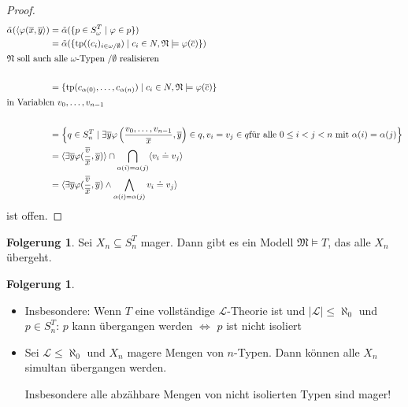 \documentclass[12pt,parskip=full]{scrartcl}
\newcommand{\abs}[1]{{\left| #1 \right|}}
\theoremstyle{definition}
\newtheorem{corollary}[theorem]{Folgerung}
\begin{document}
\begin{proof}
		\begin{align*}
			\tilde{\alpha}(\langle \varphi(\overline{x}, \overline{y} \rangle ) &= \tilde{\alpha}(\{ p \in S_\omega^T \mid \varphi \in p \}) \\
			&= \tilde{\alpha}(\{ \operatorname{tp}((c_i)_{i \in \omega / \emptyset}) \mid c_i \in N, \mathfrak{N} \models \varphi(\overline{c}) \}) \\
			\intertext{$\mathfrak{N}$ soll auch alle $\omega$-Typen $/\emptyset$ realisieren} \\
			&= \{ \operatorname{tp}(c_{\alpha(0)}, \dots, c_{\alpha(n)}) \mid c_i \in N, \mathfrak{N} \models \varphi(\overline{c}) \} \\
			\intertext{in Variablen $v_0, \dots, v_{n-1}$} \\
			&= \left\{ q \in S_n^T \mid \exists \overline{y} \varphi\left( \frac{v_0, \dots, v_{n-1}}{\overline{x}} , \overline{y} \right) \in q, v_i = v_j \in q \text{für alle $0 \leq i < j < n$ mit $\alpha(i) = \alpha(j)$} \right\} \\
			&= \langle \exists \overline{y} \varphi(\frac{\overline{v}}{\overline{x}}, \overline{y}) \rangle \cap \bigcap_{\alpha(i) = \alpha(j)} \langle v_i \doteq v_j \rangle \\
			&= \langle \exists \overline{y} \varphi(\frac{\overline{v}}{\overline{x}}, \overline{y}) \land \bigwedge_{\alpha(i) = \alpha(j)} v_i \doteq v_j \rangle
		\end{align*}
		ist offen.
	
	\end{proof}

	\begin{corollary}
		Sei $X_n \subseteq S_n^T$ mager. Dann gibt es ein Modell $\mathfrak{M} \models T$, das alle $X_n$ übergeht.
	\end{corollary}

	\begin{corollary}
		\begin{itemize}
			\item Insbesondere: Wenn $T$ eine vollständige $\mathcal{L}$-Theorie ist und $\abs{\mathcal{L}} \leq \aleph_0$ und $p \in S_n^T$: $p$ kann übergangen werden $\Leftrightarrow$ $p$ ist nicht isoliert
			\item Sei $\mathcal{L} \leq \aleph_0$ und $X_n$ magere Mengen von $n$-Typen. Dann können alle $X_n$ simultan übergangen werden.
			
			Insbesondere alle abzähbare Mengen von nicht isolierten Typen sind mager!
		\end{itemize}
	\end{corollary}
\end{document}
